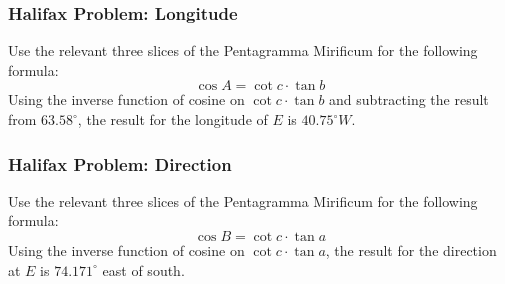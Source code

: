\documentclass[xcolor=dvipsnames]{beamer}
\begin{document}
\begin{frame}
  \frametitle{Halifax Problem: Longitude}
Use the relevant three slices of the Pentagramma Mirificum for the
following formula:
\begin{equation}
  \label{eq:theeyoom}
\cos{}A=\cot{}c\cdot\tan{}b  
\end{equation}
Using the inverse function of cosine on $\cot{}c\cdot\tan{}b$ and
subtracting the result from $63.58^{\circ}$, the result for the
longitude of $E$ is $40.75^{\circ}W$.
\end{frame}

\begin{frame}
  \frametitle{Halifax Problem: Direction}
Use the relevant three slices of the Pentagramma Mirificum for the
following formula:
\begin{equation}
  \label{eq:cheichah}
\cos{}B=\cot{}c\cdot\tan{}a  
\end{equation}
Using the inverse function of cosine on $\cot{}c\cdot\tan{}a$, the
result for the direction at $E$ is $74.171^{\circ}$ east of south.
\end{frame}
\end{document}
